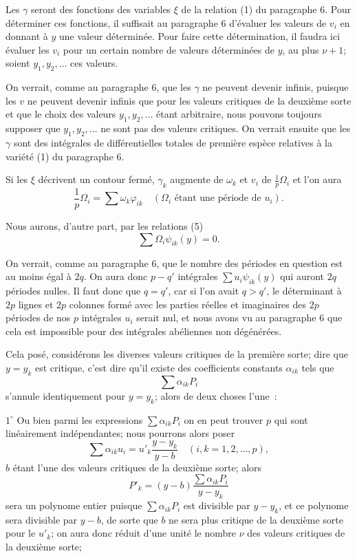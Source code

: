 \documentclass{article}
\begin{document}
Les $\gamma$ seront des fonctions des variables $\xi$ de la relation (1) du paragraphe 6. Pour déterminer ces fonctions, il suffisait au paragraphe 6 d'évaluer les valeurs de $v_{i}$ en donnant à $y$ une valeur déterminée. Pour faire cette détermination, il faudra ici évaluer les $v_{i}$ pour un certain nombre de valeurs déterminées de $y$, au plus $\nu + 1$; soient $y_{1}, y_{2}, \ldots$ ces valeurs.

On verrait, comme au paragraphe 6, que les $\gamma$ ne peuvent devenir infinis, puisque les $v$ ne peuvent devenir infinis que pour les valeurs critiques de la deuxième sorte et que le choix des valeurs $y_{1}, y_{2}, \ldots$ étant arbitraire, nous pouvons toujours supposer que $y_{1}, y_{2}, \ldots$ ne sont pas des valeurs critiques. On verrait ensuite que les $\gamma$ sont des intégrales de différentielles totales de première espèce relatives à la variété (1) du paragraphe 6.

Si les $\xi$ décrivent un contour fermé, $\gamma_{k}$ augmente de $\omega_{k}$ et $v_{i}$ de $\frac{1}{p}\Omega_{i}$ et l'on aura
\[
\frac{1}{p}\Omega_{i} = \sum \omega_{k}\varphi_{ik} \quad (\Omega_{i}\text{ étant une période de } u_{i}).
\]

Nous aurons, d'autre part, par les relations (5)
\[
\sum \Omega_{i}\psi_{ik}(y) = 0. \tag{6}
\]

On verrait, comme au paragraphe 6, que le nombre des périodes en question est au moins égal à $2q$. On aura donc $p - q'$ intégrales $\displaystyle\sum u_{i}\psi_{ik}(y)$ qui auront $2q$ périodes nulles. Il faut donc que $q = q'$, car si l'on avait $q > q'$, le déterminant à $2p$ lignes et $2p$ colonnes formé avec les parties réelles et imaginaires des $2p$ périodes de nos $p$ intégrales $u_{i}$ serait nul, et nous avons vu au paragraphe 6 que cela est impossible pour des intégrales abéliennes non dégénérées.

Cela posé, considérons les diverses valeurs critiques de la première sorte; dire que $y = y_{k}$ est critique, c'est dire qu'il existe des coefficients
constants $\alpha_{ik}$ tels que
\[
\sum \alpha_{ik} P_{i}
\]
s'annule identiquement pour $y = y_{k}$; alors de deux choses l'une~:

$1^\circ$ Ou bien parmi les expressions $\displaystyle\sum \alpha_{ik} P_{i}$ on en peut trouver $p$ qui sont linéairement indépendantes; nous pourrons alors poser
\[
\sum \alpha_{ik} u_{i} = u'_{k} \frac{y - y_{k}}{y - b} \quad (i, k = 1, 2, \ldots, p),
\]
$b$ étant l'une des valeurs critiques de la deuxième sorte; alors
\[
P'_{k} = (y - b) \frac{\sum \alpha_{ik} P_{i}}{y - y_{k}}
\]
sera un polynome entier puisque $\displaystyle\sum \alpha_{ik} P_{i}$ est divisible par $y - y_{k}$, et ce polynome sera divisible par $y - b$, de sorte que $b$ ne sera plus critique de la deuxième sorte pour le $u'_{k}$; on aura donc réduit d'une unité le nombre $\nu$ des valeurs critiques de la deuxième sorte;
\end{document}
